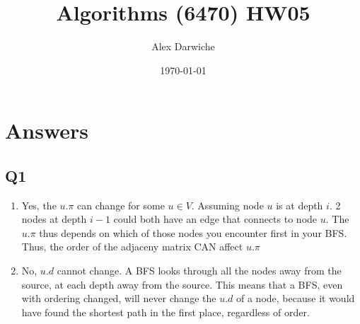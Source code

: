 \documentclass{article}
\title{Algorithms (6470) HW05}
\author{Alex Darwiche}
\date{\today}
\begin{document}
\maketitle

\section*{Answers}

\subsection*{Q1}
\begin{enumerate}[label=(\alph*)]
    \item Yes, the $u.\pi$ can change for some $u \in V$. Assuming node $u$ is at depth $i$. 2 nodes at depth $i-1$ could both have an edge that connects to node $u$. The $u.\pi$ thus depends on which of those nodes you encounter first in your BFS. Thus, the order of the adjaceny matrix CAN affect $u.\pi$
    \item No, $u.d$ cannot change. A BFS looks through all the nodes away from the source, at each depth away from the source. This means that a BFS, even with ordering changed, will never change the $u.d$ of a node, because it would have found the shortest path in the first place, regardless of order.
\end{enumerate}

\end{document}
